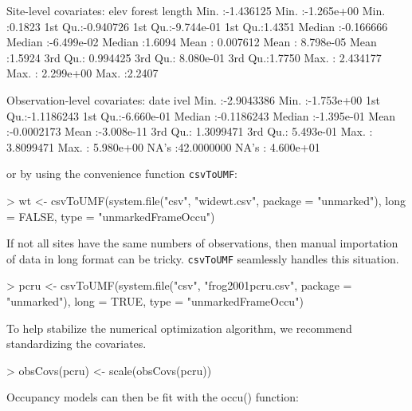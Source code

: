 \documentclass[a4paper]{article}
\renewenvironment{Schunk}{\vspace{\topsep}}{\vspace{\topsep}}
\begin{document}
\begin{Schunk}
\begin{Soutput}
Site-level covariates:
      elev               forest               length      
 Min.   :-1.436125   Min.   :-1.265e+00   Min.   :0.1823  
 1st Qu.:-0.940726   1st Qu.:-9.744e-01   1st Qu.:1.4351  
 Median :-0.166666   Median :-6.499e-02   Median :1.6094  
 Mean   : 0.007612   Mean   : 8.798e-05   Mean   :1.5924  
 3rd Qu.: 0.994425   3rd Qu.: 8.080e-01   3rd Qu.:1.7750  
 Max.   : 2.434177   Max.   : 2.299e+00   Max.   :2.2407  

Observation-level covariates:
      date                 ivel           
 Min.   :-2.9043386   Min.   :-1.753e+00  
 1st Qu.:-1.1186243   1st Qu.:-6.660e-01  
 Median :-0.1186243   Median :-1.395e-01  
 Mean   :-0.0002173   Mean   :-3.008e-11  
 3rd Qu.: 1.3099471   3rd Qu.: 5.493e-01  
 Max.   : 3.8099471   Max.   : 5.980e+00  
 NA's   :42.0000000   NA's   : 4.600e+01  
\end{Soutput}
\end{Schunk}

or by using the convenience function \verb=csvToUMF=:

\begin{Schunk}
\begin{Sinput}
> wt <- csvToUMF(system.file("csv", "widewt.csv", package = "unmarked"), 
     long = FALSE, type = "unmarkedFrameOccu")
\end{Sinput}
\end{Schunk}

If not all sites have the same numbers of observations, then manual
importation of data in long format can be tricky.  \verb=csvToUMF=
seamlessly handles this situation.

\begin{Schunk}
\begin{Sinput}
> pcru <- csvToUMF(system.file("csv", "frog2001pcru.csv", 
     package = "unmarked"), long = TRUE, type = "unmarkedFrameOccu")
\end{Sinput}
\end{Schunk}

To help stabilize the numerical optimization algorithm, we recommend
standardizing the covariates.

\begin{Schunk}
\begin{Sinput}
> obsCovs(pcru) <- scale(obsCovs(pcru))
\end{Sinput}
\end{Schunk}


Occupancy models can then be fit with the occu() function:
\end{document}
